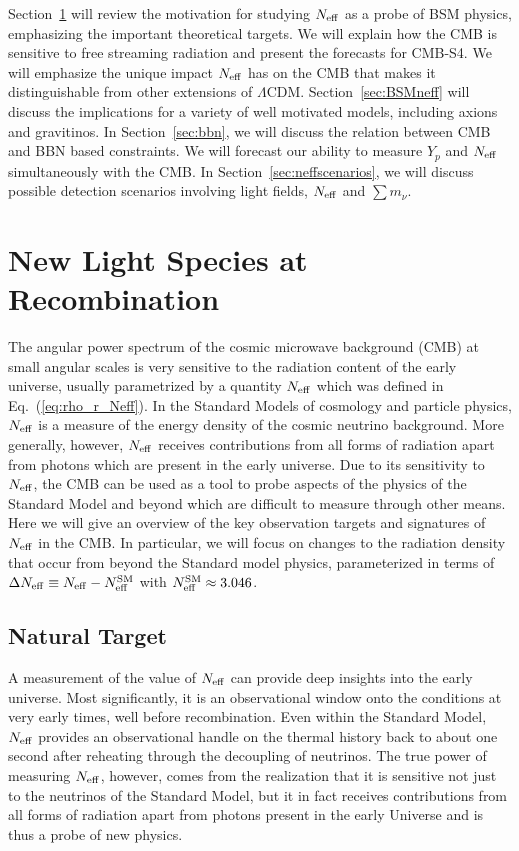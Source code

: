 Section~\ref{sec:Neff} will review the motivation for studying $N_{\rm eff}$ as a probe of BSM physics, emphasizing the important theoretical targets.  We will explain how the CMB is sensitive to free streaming radiation and present the forecasts for CMB-S4.  We will emphasize the unique impact $N_{\rm eff}$ has on the CMB that makes it distinguishable from other extensions of $\Lambda$CDM.   Section~\ref{sec:BSMneff} will discuss the implications for a variety of well motivated models, including axions and gravitinos.  In Section~\ref{sec:bbn}, we will discuss the relation between CMB and BBN based constraints.  We will forecast our ability to measure $Y_p$ and $N_{\rm eff}$ simultaneously with the CMB.  In Section~\ref{sec:neffscenarios}, we will discuss possible detection scenarios involving light fields, $N_{\rm eff}$ and $\sum m_\nu$.


\section{New Light Species at Recombination}\label{sec:Neff}


The angular power spectrum of the cosmic microwave background (CMB) at small angular scales is very sensitive to the radiation content of the early universe, usually parametrized by a quantity $N_{\rm eff}$ which was defined in Eq.~(\ref{eq:rho_r_Neff}).  In the Standard Models of cosmology and particle physics, $N_{\rm eff}$ is a measure of the energy density of the cosmic neutrino background.  More generally, however, $N_{\rm eff}$ receives contributions from all forms of radiation apart from photons which are present in the early universe.  Due to its sensitivity to $N_{\rm eff}$, the CMB can be used as a tool to probe aspects of the physics of the Standard Model and beyond which are difficult to measure through other means.  Here we will give an overview of the key observation targets and signatures of $N_{\rm eff}$ in the CMB.  In particular, we will focus on changes to the radiation density that occur from beyond the Standard model physics, parameterized in terms of $\Delta N_{\rm eff} \equiv N_{\rm eff} - N_{\rm eff}^{\rm SM}$ with $N_{\rm eff}^{\rm SM} \approx 3.046$.






\subsection{Natural Target}

A measurement of the value of $N_{\rm eff}$ can provide deep insights into the early universe.  Most significantly, it is an observational window onto the conditions at very early times, well before recombination.  Even within the Standard Model, $N_{\rm eff}$ provides an observational handle on the thermal history back to about one second after reheating through the decoupling of neutrinos.  The true power of measuring $N_{\rm eff}$, however, comes from the realization that it is sensitive not just to the neutrinos of the Standard Model, but it in fact receives contributions from all forms of radiation apart from photons present in the early Universe and is thus a probe of new physics.

